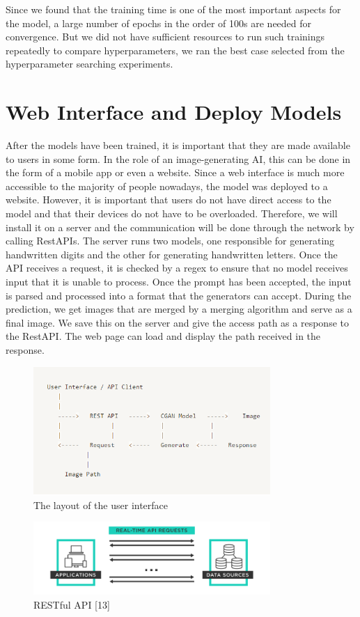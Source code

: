 \documentclass[lettersize,journal]{IEEEtran}
\begin{document}
Since we found that the training time is one of the most important aspects for the model, a large number of epochs in the order of 100s are needed for convergence. But we did not have sufficient resources to run such trainings repeatedly to compare hyperparameters, we ran the best case selected from the hyperparameter searching experiments.

\section{Web Interface and Deploy Models}
After the models have been trained, it is important that they are made available to users in some form. In the role of an image-generating AI, this can be done in the form of a mobile app or even a website. Since a web interface is much more accessible to the majority of people nowadays, the model was deployed to a website. However, it is important that users do not have direct access to the model and that their devices do not have to be overloaded. Therefore, we will install it on a server and the communication will be done through the network by calling RestAPIs. The server runs two models, one responsible for generating handwritten digits and the other for generating handwritten letters. Once the API receives a request, it is checked by a regex to ensure that no model receives input that it is unable to process. Once the prompt has been accepted, the input is parsed and processed into a format that the generators can accept. During the prediction, we get images that are merged by a merging algorithm and serve as a final image. We save this on the server and give the access path as a response to the RestAPI. The web page can load and display the path received in the response.

\begin{figure}[h]
    \centering
    \includegraphics[width=9cm]{deploy_layout.png}
    \caption{The layout of the user interface}
\end{figure}
\newpage

\begin{figure}[h]
    \centering
    \includegraphics[width=9cm]{web_api.png}
    \caption{RESTful API [13]}
\end{figure}
\end{document}
